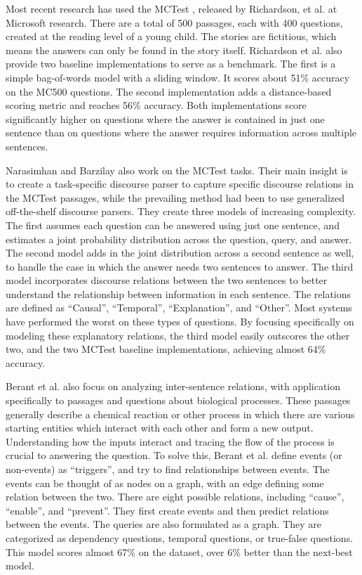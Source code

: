\documentclass[pageno]{final_paper}
\begin{document}
Most recent research has used the MCTest \cite{Richardson2013}, released by
Richardson, et al. at Microsoft research. There are a total of 500 passages,
each with 400 questions, created at the reading level of a young child. The
stories are fictitious, which means the answers can only be found in the story
itself. Richardson et al. also provide two baseline implementations to serve as
a benchmark. The first is a simple bag-of-words model with a sliding window. It
scores about 51\% accuracy on the MC500 questions. The second implementation
adds a distance-based scoring metric and reaches 56\% accuracy. Both
implementations score significantly higher on questions where the answer is
contained in just one sentence than on questions where the answer requires
information across multiple sentences.

Narasimhan and Barzilay \cite{Narasimhan2015} also work on the MCTest tasks.
Their main insight is to create a task-specific discourse parser to capture
specific discourse relations in the MCTest passages, while the prevailing method
had been to use generalized off-the-shelf discourse parsers. They create three
models of increasing complexity. The first assumes each question can be answered
using just one sentence, and estimates a joint probability distribution across
the question, query, and answer. The second model adds in the joint distribution
across a second sentence as well, to handle the case in which the answer needs
two sentences to answer. The third model incorporates discourse relations
between the two sentences to better understand the relationship between
information in each sentence. The relations are defined as ``Causal'',
``Temporal'', ``Explanation'', and ``Other''. Most systems have performed the
worst on these types of questions. By focusing specifically on modeling these
explanatory relations, the third model easily outscores the other two, and the
two MCTest baseline implementations, achieving almost 64\% accuracy.

Berant et al. \cite{Berant2014} also focus on analyzing inter-sentence
relations, with application specifically to passages and questions about
biological processes. These passages generally describe a chemical reaction or
other process in which there are various starting entities which interact with
each other and form a new output. Understanding how the inputs interact and
tracing the flow of the process is crucial to answering the question. To solve
this, Berant et al. define events (or non-events) as ``triggers'', and try to
find relationships between events. The events can be thought of as nodes on a
graph, with an edge defining some relation between the two. There are eight
possible relations, including ``cause'', ``enable'', and ``prevent''. They first
create events and then predict relations between the events. The queries are
also formulated as a graph. They are categorized as dependency questions,
temporal questions, or true-false questions. This model scores almost 67\% on
the dataset, over 6\% better than the next-best model.
\end{document}
